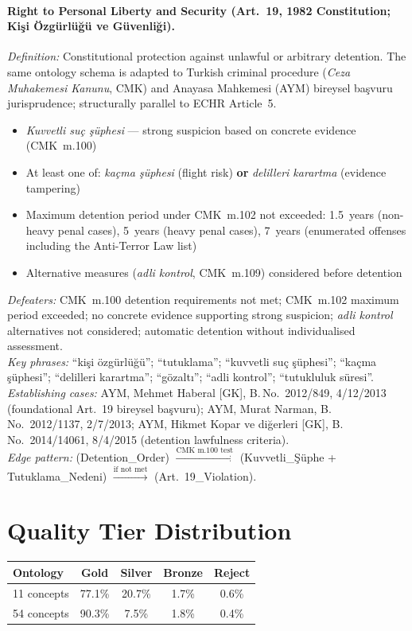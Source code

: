 \documentclass[11pt]{article}
\begin{document}
\paragraph{Right to Personal Liberty and Security (Art.~19, 1982 Constitution; Ki\c{s}i \"{O}zg\"{u}rl\"{u}\u{g}\"{u} ve G\"{u}venli\u{g}i).}
\textit{Definition:} Constitutional protection against unlawful or arbitrary detention. The same ontology schema is adapted to Turkish criminal procedure (\emph{Ceza Muhakemesi Kanunu}, CMK) and Anayasa Mahkemesi (AYM) bireysel ba\c{s}vuru jurisprudence; structurally parallel to ECHR Article~5.
\begin{itemize}[nosep,leftmargin=*]
  \item[\textsc{and}] \emph{Kuvvetli su\c{c} \c{s}\"{u}phesi} --- strong suspicion based on concrete evidence (CMK~m.100)
  \item[\textsc{and}] At least one of: \emph{ka\c{c}ma \c{s}\"{u}phesi} (flight risk) \textbf{or} \emph{delilleri karartma} (evidence tampering)
  \item[\textsc{and}] Maximum detention period under CMK~m.102 not exceeded: 1.5~years (non-heavy penal cases), 5~years (heavy penal cases), 7~years (enumerated offenses including the Anti-Terror Law list)
  \item[\textsc{and}] Alternative measures (\emph{adli kontrol}, CMK~m.109) considered before detention
\end{itemize}
\textit{Defeaters:} CMK~m.100 detention requirements not met; CMK~m.102 maximum period exceeded; no concrete evidence supporting strong suspicion; \emph{adli kontrol} alternatives not considered; automatic detention without individualised assessment.\\
\textit{Key phrases:} ``ki\c{s}i \"{o}zg\"{u}rl\"{u}\u{g}\"{u}''; ``tutuklama''; ``kuvvetli su\c{c} \c{s}\"{u}phesi''; ``ka\c{c}ma \c{s}\"{u}phesi''; ``delilleri karartma''; ``g\"{o}zalt\i''; ``adli kontrol''; ``tutukluluk s\"{u}resi''.\\
\textit{Establishing cases:} AYM, Mehmet Haberal [GK], B.\,No.~2012/849, 4/12/2013 (foundational Art.~19 bireysel ba\c{s}vuru); AYM, Murat Narman, B.\,No.~2012/1137, 2/7/2013; AYM, Hikmet Kopar ve di\u{g}erleri [GK], B.\,No.~2014/14061, 8/4/2015 (detention lawfulness criteria).\\
\textit{Edge pattern:} (Detention\_Order) $\xrightarrow{\text{CMK m.100 test}}$ (Kuvvetli\_\c{S}\"{u}phe + Tutuklama\_Nedeni) $\xrightarrow{\text{if not met}}$ (Art.~19\_Violation).

\section{Quality Tier Distribution}
\label{app:quality}

\begin{table}[h]
\small
\centering
\begin{tabular}{lcccc}
\toprule
Ontology & Gold & Silver & Bronze & Reject \\
\midrule
11 concepts & 77.1\% & 20.7\% & 1.7\% & 0.6\% \\
54 concepts & 90.3\% & 7.5\% & 1.8\% & 0.4\% \\
\bottomrule
\end{tabular}
\end{table}
\end{document}
